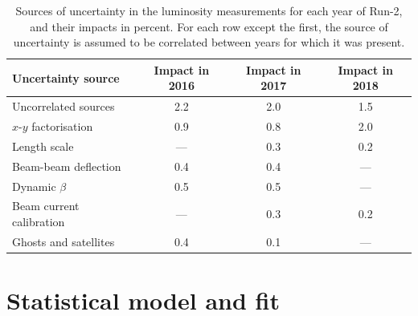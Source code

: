 \begin{table}[htbp]
    \centering
    \begin{tabular}{lccc}
        \hline
        Uncertainty source & Impact in 2016 & Impact in 2017 & Impact in 2018 \\\hline
        Uncorrelated sources & 2.2 & 2.0 & 1.5 \\
        $x$-$y$ factorisation & 0.9 & 0.8 & 2.0 \\
        Length scale & --- & 0.3 & 0.2 \\
        Beam-beam deflection & 0.4 & 0.4 & --- \\
        Dynamic $\beta$ & 0.5 & 0.5 & --- \\
        Beam current calibration & --- & 0.3 & 0.2 \\
        Ghosts and satellites & 0.4 & 0.1 & ---  \\\hline
    \end{tabular}
    \caption[Sources of uncertainty in the luminosity measurements for each year of Run-2]{Sources of uncertainty in the luminosity measurements for each year of Run-2, and their impacts in percent. For each row except the first, the source of uncertainty is assumed to be correlated between years for which it was present.}
    \label{tab:lumi_systs}
\end{table}





\section{Statistical model and fit}
\label{sec:htoinv_satistical_treatment}





